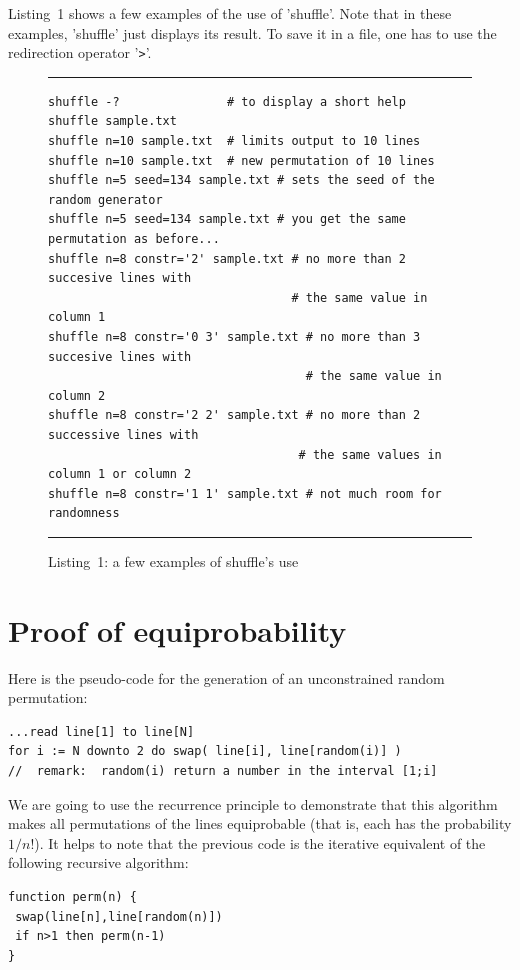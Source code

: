 \documentclass[doc]{apa}
\begin{document}
Listing~1 shows a few examples of the use of 'shuffle'. Note that in
these examples, 'shuffle' just displays its result. To save it in a
file, one has to use the redirection operator '\verb|>|'.

\begin{figure}[tb]
\caption{Listing~1: a few examples of shuffle's use}
\hrule\vspace*{4pt}
\begin{verbatim}
shuffle -?               # to display a short help
shuffle sample.txt
shuffle n=10 sample.txt  # limits output to 10 lines
shuffle n=10 sample.txt  # new permutation of 10 lines
shuffle n=5 seed=134 sample.txt # sets the seed of the random generator
shuffle n=5 seed=134 sample.txt # you get the same permutation as before...
shuffle n=8 constr='2' sample.txt # no more than 2 succesive lines with
                                  # the same value in column 1
shuffle n=8 constr='0 3' sample.txt # no more than 3 succesive lines with
                                    # the same value in column 2
shuffle n=8 constr='2 2' sample.txt # no more than 2 successive lines with
                                   # the same values in column 1 or column 2
shuffle n=8 constr='1 1' sample.txt # not much room for randomness
\end{verbatim}
\hrule
\end{figure}


\section*{Proof of equiprobability}

Here is the pseudo-code for the generation of an unconstrained random
permutation:

\begin{verbatim}
...read line[1] to line[N]
for i := N downto 2 do swap( line[i], line[random(i)] )
//  remark:  random(i) return a number in the interval [1;i]
\end{verbatim}

We are going to use the recurrence principle to demonstrate that this
algorithm makes all permutations of the lines equiprobable (that is,
each has the probability $1/n!$). It helps to note that the
previous code is the iterative equivalent of the following recursive
algorithm:

\begin{verbatim}
function perm(n) {
 swap(line[n],line[random(n)])
 if n>1 then perm(n-1) 
}
\end{verbatim}
\end{document}
